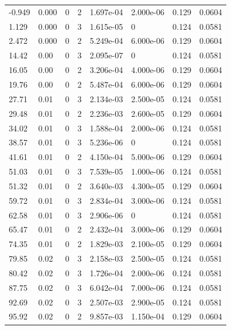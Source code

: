 \documentclass[preview]{standalone}
\begin{document}
{{\begin{tabular}{L{1.2cm}C{1.2cm} C{0.3cm}C{0.5cm} C{1.4cm}C{1.4cm} C{1.4cm}C{1.4cm}}
  -0.949  &  0.000  & 0     &  2 &  1.697e-04  & 2.000e-06  & 0.129 &  0.0604   \\ 
  1.129  &  0.000  & 0     &  3 &  1.615e-05  & 0  & 0.124 &  0.0581   \\ 
  2.472  &  0.000  & 0     &  2 &  5.249e-04  & 6.000e-06  & 0.129 &  0.0604   \\ 
  14.42  &  0.00  & 0     &  3 &  2.095e-07  & 0  & 0.124 &  0.0581   \\ 
  16.05  &  0.00  & 0     &  2 &  3.206e-04  & 4.000e-06  & 0.129 &  0.0604   \\ 
  19.76  &  0.00  & 0     &  2 &  5.487e-04  & 6.000e-06  & 0.129 &  0.0604   \\ 
  27.71  &  0.01  & 0     &  3 &  2.134e-03  & 2.500e-05  & 0.124 &  0.0581   \\ 
  29.48  &  0.01  & 0     &  2 &  2.236e-03  & 2.600e-05  & 0.129 &  0.0604   \\ 
  34.02  &  0.01  & 0     &  3 &  1.588e-04  & 2.000e-06  & 0.124 &  0.0581   \\ 
  38.57  &  0.01  & 0     &  3 &  5.236e-06  & 0  & 0.124 &  0.0581   \\ 
  41.61  &  0.01  & 0     &  2 &  4.150e-04  & 5.000e-06  & 0.129 &  0.0604   \\ 
  51.03  &  0.01  & 0     &  3 &  7.539e-05  & 1.000e-06  & 0.124 &  0.0581   \\ 
  51.32  &  0.01  & 0     &  2 &  3.640e-03  & 4.300e-05  & 0.129 &  0.0604   \\ 
  59.72  &  0.01  & 0     &  3 &  2.834e-04  & 3.000e-06  & 0.124 &  0.0581   \\ 
  62.58  &  0.01  & 0     &  3 &  2.906e-06  & 0  & 0.124 &  0.0581   \\ 
  65.47  &  0.01  & 0     &  2 &  2.432e-04  & 3.000e-06  & 0.129 &  0.0604   \\ 
  74.35  &  0.01  & 0     &  2 &  1.829e-03  & 2.100e-05  & 0.129 &  0.0604   \\ 
  79.85  &  0.02  & 0     &  3 &  2.158e-03  & 2.500e-05  & 0.124 &  0.0581   \\ 
  80.42  &  0.02  & 0     &  3 &  1.726e-04  & 2.000e-06  & 0.124 &  0.0581   \\ 
  87.75  &  0.02  & 0     &  3 &  6.042e-04  & 7.000e-06  & 0.124 &  0.0581   \\ 
  92.69  &  0.02  & 0     &  3 &  2.507e-03  & 2.900e-05  & 0.124 &  0.0581   \\ 
  95.92  &  0.02  & 0     &  2 &  9.857e-03  & 1.150e-04  & 0.129 &  0.0604   \\ 

\end{tabular}}}
\end{document}
